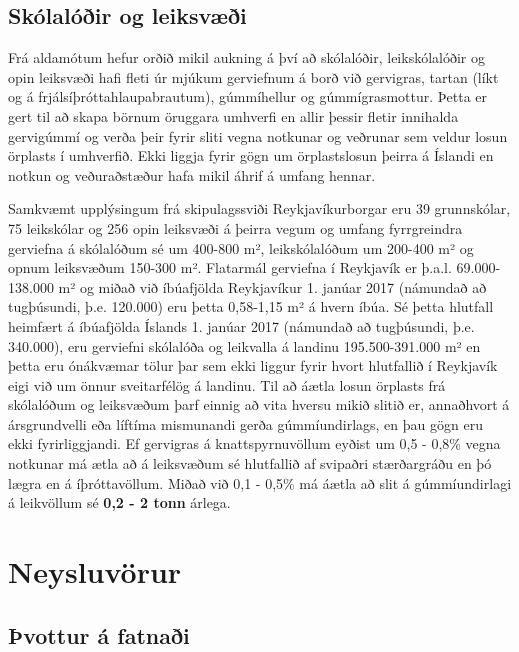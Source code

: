 \documentclass[icelandic,]{book}
\begin{document}
\hypertarget{skolaloir-og-leiksvi}{%
\subsection*{Skólalóðir og leiksvæði}\label{skolaloir-og-leiksvi}}

Frá aldamótum hefur orðið mikil aukning á því að skólalóðir, leikskólalóðir og opin leiksvæði hafi fleti úr mjúkum gerviefnum á borð við gervigras, tartan (líkt og á frjálsíþróttahlaupabrautum), gúmmíhellur og gúmmígrasmottur. Þetta er gert til að skapa börnum öruggara umhverfi en allir þessir fletir innihalda gervigúmmí og verða þeir fyrir sliti vegna notkunar og veðrunar sem veldur losun örplasts í umhverfið. Ekki liggja fyrir gögn um örplastslosun þeirra á Íslandi en notkun og veðuraðstæður hafa mikil áhrif á umfang hennar.

Samkvæmt upplýsingum frá skipulagssviði Reykjavíkurborgar eru 39 grunnskólar, 75 leikskólar og 256 opin leiksvæði á þeirra vegum og umfang fyrrgreindra gerviefna á skólalóðum sé um 400-800 m², leikskólalóðum um 200-400 m² og opnum leiksvæðum 150-300 m². Flatarmál gerviefna í Reykjavík er þ.a.l. 69.000-138.000 m² og miðað við íbúafjölda Reykjavíkur 1. janúar 2017 (námundað að tugþúsundi, þ.e. 120.000) eru þetta 0,58-1,15 m² á hvern íbúa. Sé þetta hlutfall heimfært á íbúafjölda Íslands 1. janúar 2017 (námundað að tugþúsundi, þ.e. 340.000), eru gerviefni skólalóða og leikvalla á landinu 195.500-391.000 m² en þetta eru ónákvæmar tölur þar sem ekki liggur fyrir hvort hlutfallið í Reykjavík eigi við um önnur sveitarfélög á landinu. Til að áætla losun örplasts frá skólalóðum og leiksvæðum þarf einnig að vita hversu mikið slitið er, annaðhvort á ársgrundvelli eða líftíma mismunandi gerða gúmmíundirlags, en þau gögn eru ekki fyrirliggjandi. Ef gervigras á knattspyrnuvöllum eyðist um 0,5 - 0,8\% vegna notkunar má ætla að á leiksvæðum sé hlutfallið af svipaðri stærðargráðu en þó lægra en á íþróttavöllum. Miðað við 0,1 - 0,5\% má áætla að slit á gúmmíundirlagi á leikvöllum sé \textbf{0,2 - 2 tonn} árlega.

\hypertarget{neysluvara}{%
\section*{Neysluvörur}\label{neysluvara}}

\hypertarget{vottur-a-fatnai}{%
\subsection*{Þvottur á fatnaði}\label{vottur-a-fatnai}}
\end{document}
